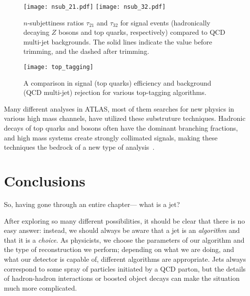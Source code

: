 
\begin{figure}
\centering
\texttt{[image: nsub\_21.pdf]}
\texttt{[image: nsub\_32.pdf]}
\label{fig:jets:nsub}
\caption{$n$-subjettiness ratios $\tau_{21}$ and $\tau_{32}$ for signal events (hadronically decaying $Z$ bosons and top quarks, respectively) compared to QCD multi-jet backgrounds. The solid lines indicate the value before trimming, and the dashed after trimming.}
\end{figure}




\begin{figure}
\centering
\texttt{[image: top\_tagging]}
\label{fig:jets:top_tagging}
\caption{A comparison in signal (top quarks) efficiency and background (QCD multi-jet) rejection for various top-tagging algorithms.}
\end{figure}





Many different analyses in ATLAS, most of them searches for new physics in various high mass channels, have utilized these substruture techniques. Hadronic decays of top quarks and bosons often have the dominant branching fractions, and high mass systems create strongly collimated signals, making these techniques the bedrock of a new type of analysis~\cite{Aad:2015owa,Aad:2015fna,Aad:2014xea,Aad:2014kra,Aad:2014bva,Aad:2013wta,ATLAS:2012dp,RPVSUSY}.

\section{Conclusions}

So, having gone through an entire chapter--- what is a jet?

After exploring so many different possibilities, it should be clear that there is no easy answer: instead, we should always be aware that a jet is an \textit{algorithm} and that it is a \textit{choice}. As physicists, we choose the parameters of our algorithm and the type of reconstruction we perform; depending on what we are doing, and what our detector is capable of, different algorithms are appropriate. Jets always correspond to some spray of particles initiated by a QCD parton, but the details of hadron-hadron interactions or boosted object decays can make the situation much more complicated.

